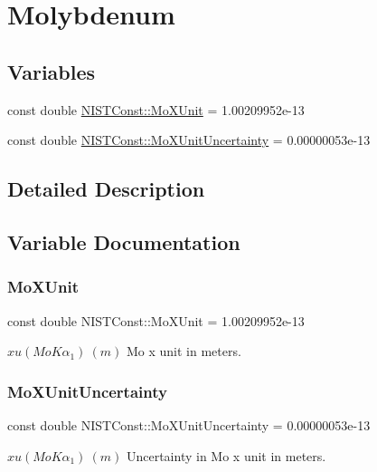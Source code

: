 \hypertarget{group___molybdenum}{}\section{Molybdenum}
\label{group___molybdenum}
\subsection*{Variables}
\begin{DoxyCompactItemize}
\item 
const double \hyperlink{group___molybdenum_ga31f18ed601e6b0e9ebe95a3ac3d962f5}{N\+I\+S\+T\+Const\+::\+Mo\+X\+Unit} = 1.\+00209952e-\/13
\item 
const double \hyperlink{group___molybdenum_ga19a2cda46a2fb26d7036c47c53cdd607}{N\+I\+S\+T\+Const\+::\+Mo\+X\+Unit\+Uncertainty} = 0.\+00000053e-\/13
\end{DoxyCompactItemize}


\subsection{Detailed Description}


\subsection{Variable Documentation}
\mbox{\label{group___molybdenum_ga31f18ed601e6b0e9ebe95a3ac3d962f5}} 
\subsubsection{\texorpdfstring{Mo\+X\+Unit}{MoXUnit}}
{\footnotesize\ttfamily const double N\+I\+S\+T\+Const\+::\+Mo\+X\+Unit = 1.\+00209952e-\/13}

$xu(MoK\alpha_1) \ (m)$ Mo x unit in meters. \mbox{\label{group___molybdenum_ga19a2cda46a2fb26d7036c47c53cdd607}} 
\subsubsection{\texorpdfstring{Mo\+X\+Unit\+Uncertainty}{MoXUnitUncertainty}}
{\footnotesize\ttfamily const double N\+I\+S\+T\+Const\+::\+Mo\+X\+Unit\+Uncertainty = 0.\+00000053e-\/13}

$xu(MoK\alpha_1) \ (m)$ Uncertainty in Mo x unit in meters. 